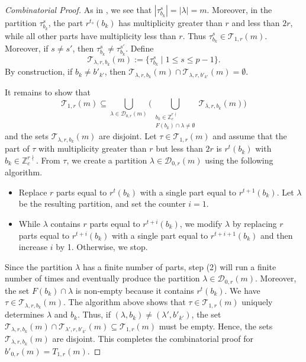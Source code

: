 \documentclass[reqno,12pt]{amsart}
\theoremstyle{definition}
\begin{document}
\begin{proof}[Combinatorial Proof]
As in \cite{Yang19}, we see that $|\tau^s_{b_k}|=|\lambda|=m$. Moreover, in the partition $\tau_{b_k}^s$, the part $r^{t_s}(b_k)$ has multiplicity greater than $r$ and less than $2r$, while all other parts have multiplicity less than $r$. Thus $\tau^s_{b_k}\in \mathcal T_{1,r}(m)$. Moreover, if $s\neq s'$, then $\tau^s_{b_k}\neq \tau^{s'}_{b_k}$. Define 
$$\mathcal T_{\lambda, r, b_k}(m):=\{\tau^s_{b_k} \mid 1\leq s \leq p-1\}.$$ 
By construction, if $b_k\neq b'_{k'}$, then $\mathcal T_{\lambda, r, b_k}(m)\cap \mathcal T_{\lambda, r, b'_{k'}}(m)=\emptyset$. 

It remains to show that $$\mathcal T_{1,r}(m)\subseteq \bigcup_{\lambda\in \mathcal D_{0,r}(m)}\Big(\bigcup_{\substack{b_k\in \mathbb Z_c^{r \nmid}\\ F(b_k)\cap \lambda\neq \emptyset}} \mathcal T_{\lambda, r, b_k}(m)\Big)$$ and  the sets $\mathcal T_{\lambda, r, b_k}(m)$ are disjoint. Let $\tau \in \mathcal T_{1,r}(m)$ and assume that the part of $\tau$ with multiplicity greater than $r$ but less than $2r$ is $r^t(b_k)$ with $b_k\in \mathbb Z_c^{r\nmid}$. From $\tau$, we create a partition $\lambda \in \mathcal D_{0,r}(m)$ using the following algorithm. 

 
\begin{itemize}

\item[(1)] Replace $r$ parts equal to $r^t(b_k)$ with a single part equal to $r^{t+1}(b_k)$. Let $\lambda$ be the resulting partition, and set the counter $i=1$.

\item[(2)] While $\lambda$ contains $r$ parts equal to $r^{t+i}(b_k)$, we modify $\lambda$ by replacing $r$ parts equal to $r^{t+i}(b_k)$ with a single part equal to $r^{t+i+1}(b_k)$ and then increase $i$ by 1.
Otherwise, we stop.
\end{itemize}



Since the partition $\lambda$ has a finite number of parts, step (2) will run a finite number of times and eventually produce the partition $\lambda \in \mathcal{D}_{0,r}(m)$. 
Moreover, the set $F(b_k)\cap \lambda$ is non-empty  because it contains $r^t(b_k)$.
We have $\tau \in \mathcal T_{\lambda, r, b_k}(m)$. 
 The algorithm above shows that $\tau\in \mathcal T_{1,r}(m)$ uniquely determines $\lambda$ and $b_k$.  Thus, if $(\lambda, b_k)\neq (\lambda', b'_{k'})$, the set $\mathcal{T}_{\lambda, r, b_k}(m)\cap \mathcal{T}_{\lambda', r, b'_{k'}}(m)\subseteq \mathcal T_{1,r}(m)$ must be empty. Hence, the sets $\mathcal T_{\lambda, r, b_k}(m)$ are disjoint.  
This completes the combinatorial proof for $b'_{0,r}(m)=T_{1,r}(m)$.



\end{proof}
\end{document}
